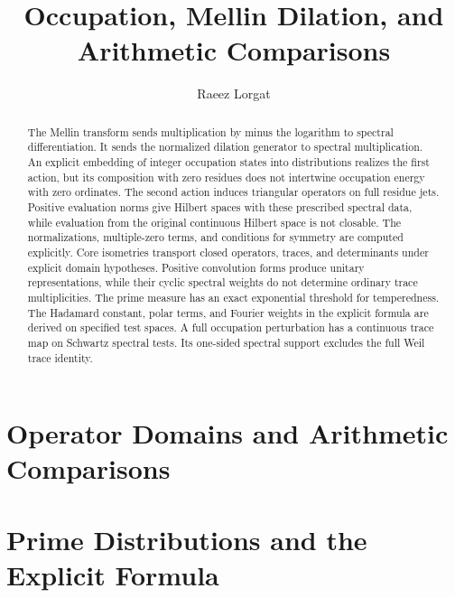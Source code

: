 \documentclass[11pt]{memoir}
\title{Occupation, Mellin Dilation, and Arithmetic Comparisons}
\author{Raeez Lorgat}
\date{}
\begin{document}
\maketitle
\begin{abstract}
The Mellin transform sends multiplication by minus the logarithm to
spectral differentiation. It sends the normalized dilation generator
to spectral multiplication. An explicit embedding of integer
occupation states into distributions realizes the first action, but
its composition with zero residues does not intertwine occupation
energy with zero ordinates. The second action induces triangular
operators on full residue jets. Positive evaluation norms give
Hilbert spaces with these prescribed spectral data, while evaluation
from the original continuous Hilbert space is not closable. The
normalizations, multiple-zero terms, and conditions for symmetry are
computed explicitly.
Core isometries transport closed operators, traces, and determinants
under explicit domain hypotheses. Positive convolution forms produce
unitary representations, while their cyclic spectral weights do not
determine ordinary trace multiplicities.
The prime measure has an exact exponential threshold for temperedness.
The Hadamard constant, polar terms, and Fourier weights in the explicit
formula are derived on specified test spaces. A full occupation
perturbation has a continuous trace map on Schwartz spectral tests.
Its one-sided spectral support excludes the full Weil trace identity.
\end{abstract}


\chapter{Operator Domains and Arithmetic Comparisons}


\chapter{Prime Distributions and the Explicit Formula}




\end{document}
